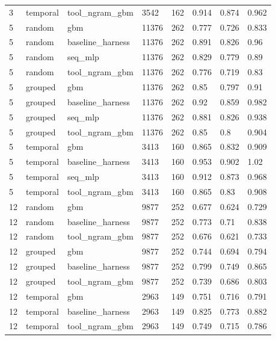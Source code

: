 \begin{tabular}{llllllll}
3 & temporal & tool\_ngram\_gbm & 3542 & 162 & 0.914 & 0.874 & 0.962 \\
5 & random & gbm & 11376 & 262 & 0.777 & 0.726 & 0.833 \\
5 & random & baseline\_harness & 11376 & 262 & 0.891 & 0.826 & 0.96 \\
5 & random & seq\_mlp & 11376 & 262 & 0.829 & 0.779 & 0.89 \\
5 & random & tool\_ngram\_gbm & 11376 & 262 & 0.776 & 0.719 & 0.83 \\
5 & grouped & gbm & 11376 & 262 & 0.85 & 0.797 & 0.91 \\
5 & grouped & baseline\_harness & 11376 & 262 & 0.92 & 0.859 & 0.982 \\
5 & grouped & seq\_mlp & 11376 & 262 & 0.881 & 0.826 & 0.938 \\
5 & grouped & tool\_ngram\_gbm & 11376 & 262 & 0.85 & 0.8 & 0.904 \\
5 & temporal & gbm & 3413 & 160 & 0.865 & 0.832 & 0.909 \\
5 & temporal & baseline\_harness & 3413 & 160 & 0.953 & 0.902 & 1.02 \\
5 & temporal & seq\_mlp & 3413 & 160 & 0.912 & 0.873 & 0.968 \\
5 & temporal & tool\_ngram\_gbm & 3413 & 160 & 0.865 & 0.83 & 0.908 \\
12 & random & gbm & 9877 & 252 & 0.677 & 0.624 & 0.729 \\
12 & random & baseline\_harness & 9877 & 252 & 0.773 & 0.71 & 0.838 \\
12 & random & tool\_ngram\_gbm & 9877 & 252 & 0.676 & 0.621 & 0.733 \\
12 & grouped & gbm & 9877 & 252 & 0.744 & 0.694 & 0.794 \\
12 & grouped & baseline\_harness & 9877 & 252 & 0.799 & 0.749 & 0.865 \\
12 & grouped & tool\_ngram\_gbm & 9877 & 252 & 0.739 & 0.686 & 0.803 \\
12 & temporal & gbm & 2963 & 149 & 0.751 & 0.716 & 0.791 \\
12 & temporal & baseline\_harness & 2963 & 149 & 0.825 & 0.773 & 0.882 \\
12 & temporal & tool\_ngram\_gbm & 2963 & 149 & 0.749 & 0.715 & 0.786 \\
\bottomrule
\end{tabular}